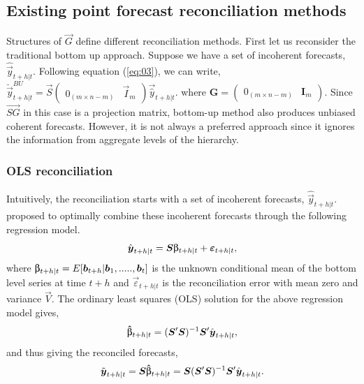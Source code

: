 \documentclass[graybox]{svmult}
\begin{document}
\subsection{Existing point forecast reconciliation methods}

Structures of $\vec{G}$ define different reconciliation methods. First let us reconsider the traditional bottom up approach. Suppose we have a set of incoherent forecasts, $\hat{\vec{y}}_{t+h|t}$. Following equation (\ref{eq:03}), we can write, $\breve{\vec{y}}^{BU}_{t+h|t}=\vec{S}\begin{pmatrix}
0_{(m \times n-m)} & \vec{I}_m
\end{pmatrix}\vec{\hat{y}}_{t+h|t}$. where $\bm{G}=\begin{pmatrix}
0_{(m \times n-m)} & \bm{I}_m
\end{pmatrix}$. Since $\vec{SG}$ in this case is a projection matrix, bottom-up method also produces unbiased coherent forecasts. However, it is not always a preferred approach since it ignores the information from aggregate levels of the hierarchy.

\subsubsection{OLS reconciliation}

Intuitively, the reconciliation starts with a set of incoherent forecasts, $\hat{\vec{y}}_{t+h|t}$. \cite{hyndman2011} proposed to optimally combine these incoherent forecasts through the following regression model.  
\begin{equation} \label{eq:09}
\hat{\vec{y}}_{t+h|t} = \vec{S\ubeta}_{t+h|t} + \vec{\varepsilon}_{t+h|t},
\end{equation}
where $\vec{\ubeta}_{t+h|t}=E[\vec{b}_{t+h}|\vec{b}_1,.....,\vec{b}_t]$ is the unknown conditional mean of the bottom level series at time $t+h$ and $\vec{\varepsilon}_{t+h|t}$ is the reconciliation error with mean zero and variance $\vec{V}$. The ordinary least squares (OLS) solution for the above regression model gives, 
\begin{equation} \label{eq:10}
\vec{\hat{\ubeta}}_{t+h|t} = (\vec{S}'\vec{S})^{-1}\vec{S}'\hat{\vec{y}}_{t+h|t},
\end{equation}
and thus giving the reconciled forecasts, 
\begin{equation} \label{eq:11}
\tilde{\vec{y}}_{t+h|t} = \vec{S\hat{\ubeta}}_{t+h|t} = \vec{S}(\vec{S}'\vec{S})^{-1}\vec{S}'\hat{\vec{y}}_{t+h|t}.
\end{equation}
\end{document}
